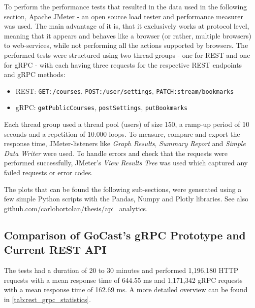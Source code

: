 To perform the performance tests that resulted in the data used in the following section, \href{https://jmeter.apache.org/}{Apache JMeter} - an open source load tester and performance measurer was used. The main advantage of it is, that it exclusively works at protocol level, meaning that it appears and behaves like a browser (or rather, multiple browsers) to web-services, while not performing all the actions supported by browsers. The performed tests were structured using two thread groups - one for REST and one for gRPC - with each having three requests for the respective REST endpoints and gRPC methods:
\begin{itemize}
    \item REST: \texttt{GET:/courses}, \texttt{POST:/user/settings}, \texttt{PATCH:stream/bookmarks}
    \item gRPC: \texttt{getPublicCourses}, \texttt{postSettings}, \texttt{putBookmarks}
\end{itemize}
Each thread group used a thread pool (users) of size 150, a ramp-up period of 10 seconds and a repetition of 10.000 loops.
To measure, compare and export the response time, JMeter-listeners like \textit{Graph Results}, \textit{Summary Report} and \textit{Simple Data Writer} were used. To handle errors and check that the requests were performed successfully, JMeter’s \textit{View Results Tree} was used which captured any failed requests or error codes.

The plots that can be found the following sub-sections, were generated using a few simple Python scripts with the Pandas, Numpy and Plotly libraries. See also \href{https://github.com/carlobortolan/thesis/api\_analytics}{github.com/carlobortolan/thesis/api\_analytics}.

\subsection{Comparison of GoCast's gRPC Prototype and Current REST API}
The tests had a duration of 20 to 30 minutes and performed 1,196,180 HTTP requests with a mean response time of 644.55 ms and 1,171,342 gRPC requests with a mean response time of 162.69 ms. A more detailed overview can be found in \autoref{tab:rest_grpc_statistics}.

